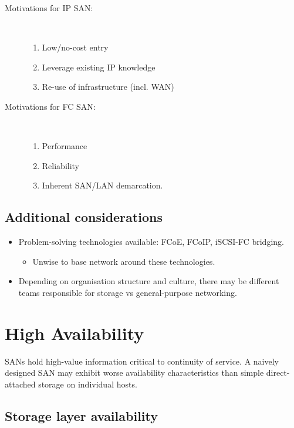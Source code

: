 \documentclass[slides]{pgnotes}
\begin{document}
\begin{description}
\item[Motivations for IP SAN:] ~ 
  \begin{enumerate}
  \item Low/no-cost entry
  \item Leverage existing IP knowledge
  \item Re-use of infrastructure (incl. WAN)
  \end{enumerate}
\item[Motivations for FC SAN:] ~ 
  \begin{enumerate}
  \item Performance
  \item Reliability
  \item Inherent SAN/LAN demarcation.
  \end{enumerate}
\end{description}

\subsection{Additional considerations}

\begin{itemize}
\item
  Problem-solving technologies available: FCoE, FCoIP, iSCSI-FC
  bridging.
  \begin{itemize}
  \item Unwise to base network around these technologies.
  \end{itemize}
\item
  Depending on organisation structure and culture, there may be
  different teams responsible for storage vs general-purpose networking.
\end{itemize}

\section{High Availability}
\label{sec:high-availability}

SANs hold high-value information critical to continuity of service. A
naively designed SAN may exhibit worse availability characteristics than
simple direct-attached storage on individual hosts.

\subsection{Storage layer availability}
\label{sec:storage-layer-availability}
\end{document}

